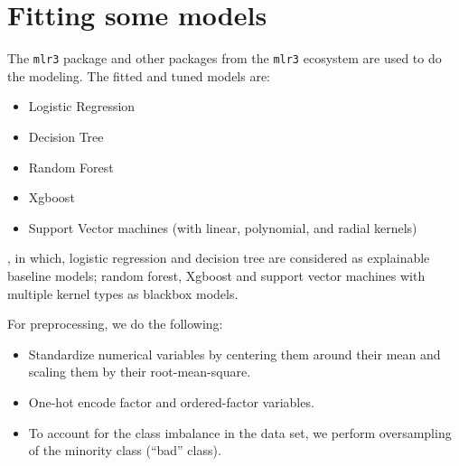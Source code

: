 \documentclass[
]{article}
\providecommand{\tightlist}{%
  \setlength{\itemsep}{0pt}\setlength{\parskip}{0pt}}
\begin{document}
\hypertarget{fitting-some-models}{%
\section{Fitting some models}\label{fitting-some-models}}

The \texttt{mlr3} package and other packages from the \texttt{mlr3} ecosystem are used to do the modeling.
The fitted and tuned models are:

\begin{itemize}
\tightlist
\item
  Logistic Regression
\item
  Decision Tree
\item
  Random Forest
\item
  Xgboost
\item
  Support Vector machines (with linear, polynomial, and radial kernels)
\end{itemize}

, in which, logistic regression and decision tree are considered as explainable baseline models; random forest, Xgboost and support vector machines with multiple kernel types as blackbox models.

For preprocessing, we do the following:

\begin{itemize}
\tightlist
\item
  Standardize numerical variables by centering them around their mean and scaling them by their root-mean-square.
\item
  One-hot encode factor and ordered-factor variables.
\item
  To account for the class imbalance in the data set, we perform oversampling of the minority class (``bad'' class).
\end{itemize}
\end{document}
